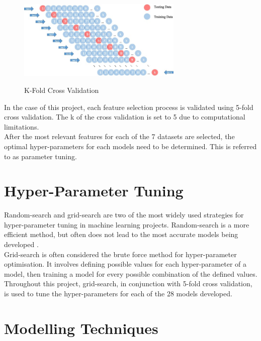 \vspace{10 pt}

\begin{figure}[!htb]
\centering
\includegraphics[width=0.7\textwidth]{images/k_fold.jpg}
\caption{K-Fold Cross Validation}
\label{fig:k_fold}
\parencite{k_fold}
\end{figure}

\vspace{10 pt}

In the case of this project, each feature selection process is validated using 5-fold cross validation. The k of the cross validation is set to 5 due to computational limitations. \\

After the most relevant features for each of the 7 datasets are selected, the optimal hyper-parameters for each models need to be determined. This is referred to as  parameter tuning. 

\section{Hyper-Parameter Tuning}

Random-search and grid-search are two of the most widely used strategies for hyper-parameter tuning in machine learning projects. Random-search is a more efficient method, but often does not lead to the most accurate models being developed \parencite{search1}. \\

Grid-search is often considered the brute force method for hyper-parameter optimisation. It involves defining possible values for each hyper-parameter of a model, then training a model for every possible combination of the defined values.  \\

Throughout this project, grid-search, in conjunction with 5-fold cross validation, is used to tune the hyper-parameters for each of the 28 models developed. 

\section{Modelling Techniques}

